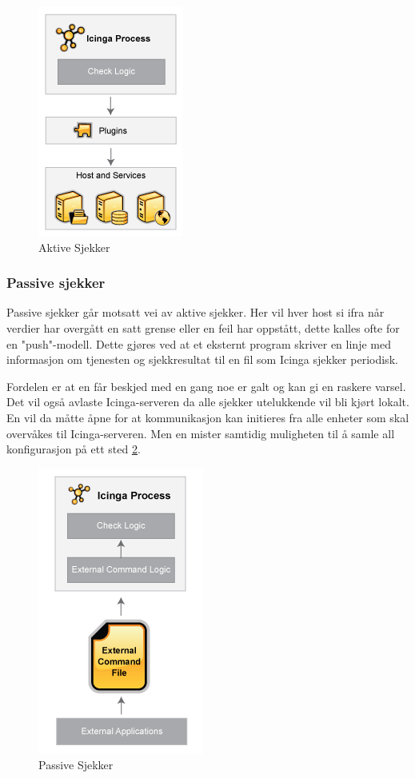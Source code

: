 \begin{figure}
   \centering 
   \includegraphics{img/activechecks.png}
    \caption{Aktive Sjekker}
    \label{active_checks}
\end{figure}

\subsubsection{Passive sjekker}
Passive sjekker går motsatt vei av aktive sjekker. Her vil hver host si ifra når verdier har overgått en satt grense eller en feil har oppstått, dette kalles ofte for en "push"-modell. Dette gjøres ved at et eksternt program skriver en linje med informasjon om tjenesten og sjekkresultat til en fil som Icinga sjekker periodisk.

Fordelen er at en får beskjed med en gang noe er galt og kan gi en raskere varsel. Det vil også avlaste Icinga-serveren da alle sjekker utelukkende vil bli kjørt lokalt. En vil da måtte åpne for at kommunikasjon kan initieres fra alle enheter som skal overvåkes til Icinga-serveren. Men en mister samtidig muligheten til å samle all konfigurasjon på ett sted \ref{passive_checks}.

\begin{figure}
    \centering
    \includegraphics[scale=0.7]{img/passivechecks.png}
    \caption{Passive Sjekker}
    \label{passive_checks}
\end{figure}

